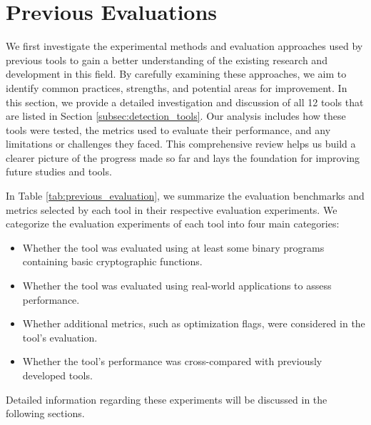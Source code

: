 \section{Previous Evaluations}
\label{sec:cryptobinary-previous}
We first investigate the experimental methods and evaluation approaches used by previous tools to gain a better understanding of the existing research and development in this field. By carefully examining these approaches, we aim to identify common practices, strengths, and potential areas for improvement. In this section, we provide a detailed investigation and discussion of all 12 tools that are listed in Section \ref{subsec:detection_tools}. Our analysis includes how these tools were tested, the metrics used to evaluate their performance, and any limitations or challenges they faced. This comprehensive review helps us build a clearer picture of the progress made so far and lays the foundation for improving future studies and tools.

In Table \ref{tab:previous_evaluation}, we summarize the evaluation benchmarks and metrics selected by each tool in their respective evaluation experiments. We categorize the evaluation experiments of each tool into four main categories:
\begin{itemize}
    \item Whether the tool was evaluated using at least some binary programs containing basic cryptographic functions.
    \item Whether the tool was evaluated using real-world applications to assess performance.
    \item Whether additional metrics, such as optimization flags, were considered in the tool's evaluation.
    \item Whether the tool's performance was cross-compared with previously developed tools.
\end{itemize}

Detailed information regarding these experiments will be discussed in the following sections.

